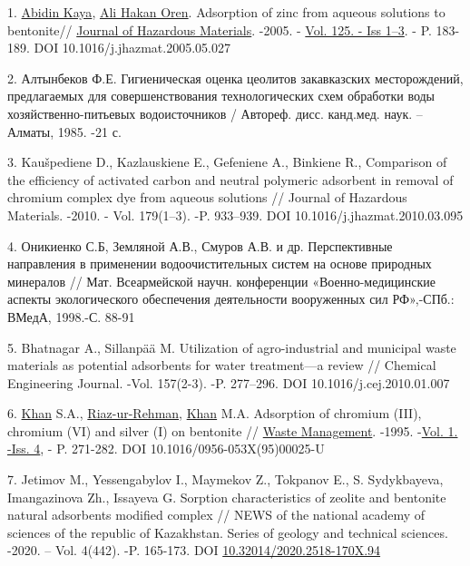 \begin{references}
1.
\href{https://www.sciencedirect.com/science/article/abs/pii/S0304389405002669\#!}{Abidin
Kaya},
\href{https://www.sciencedirect.com/science/article/abs/pii/S0304389405002669\#!}{Ali
Hakan Oren}. Adsorption of zinc from aqueous solutions to bentonite//
\href{https://www.sciencedirect.com/science/journal/03043894}{Journal of
Hazardous Materials}. -2005. -
\href{https://www.sciencedirect.com/science/journal/03043894/125/1}{Vol.
125. - Iss 1--3}. - P. 183-189. DOI 10.1016/j.jhazmat.2005.05.027

2. Алтынбеков Ф.Е. Гигиеническая оценка цеолитов закавказских
месторождений, предлагаемых для совершенствования технологических схем
обработки воды хозяйственно-питьевых водоисточников / Автореф. дисс.
канд.мед. наук. -- Алматы, 1985. -21 с.

3. Kaušpediene D., Kazlauskiene E., Gefeniene A., Binkiene R.,
Comparison of the efficiency of activated carbon and neutral polymeric
adsorbent in removal of chromium complex dye from aqueous solutions //
Journal of Hazardous Materials. -2010. - Vol. 179(1--3). -P. 933--939.
DOI 10.1016/j.jhazmat.2010.03.095

4. Оникиенко С.Б, Земляной А.В., Смуров А.В. и др. Перспективные
направления в применении водоочистительных систем на основе природных
минералов // Мат. Всеармейской научн. конфе­ренции «Военно-медицинские
аспекты экологического обеспече­ния деятельности вооруженных сил
РФ»,-СПб.: ВМедА, 1998.-С. 88-91

5. Bhatnagar A., Sillanpää M. Utilization of agro-industrial and
municipal waste materials as potential adsorbents for water
treatment---a review // Chemical Engineering Journal. -Vol. 157(2-3).
-P. 277--296. DOI 10.1016/j.cej.2010.01.007

6.
\href{https://www.sciencedirect.com/science/article/pii/0956053X9500025U\#!}{Khan}
S.A.,
\href{https://www.sciencedirect.com/science/article/pii/0956053X9500025U\#!}{Riaz-ur-Rehman},
\href{https://www.sciencedirect.com/science/article/pii/0956053X9500025U\#!}{Khan}
M.A. Adsorption of chromium (III), chromium (VI) and silver (I) on
bentonite //
\href{https://www.sciencedirect.com/science/journal/0956053X}{Waste
Management}. -1995.
-\href{https://www.sciencedirect.com/science/journal/0956053X/15/4}{Vol.
1. -Iss. 4}, - P. 271-282. DOI 10.1016/0956-053X(95)00025-U

7. Jetimov M., Yessengabylov I., Maymekov Z., Tokpanov E., S.
Sydykbayeva, Imangazinova Zh., Issayeva G. Sorption characteristics of
zeolite and bentonite natural adsorbents modified complex // NEWS of the
national academy of sciences of the republic of Kazakhstan. Series of
geology and technical sciences. -2020. -- Vol. 4(442). -P. 165-173. DOI
\href{http://dx.doi.org/10.32014/2020.2518-170X.94}{10.32014/2020.2518-170X.94}


\end{references}
